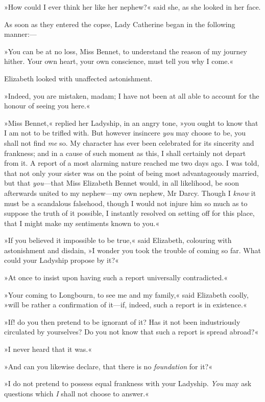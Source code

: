 »How could I ever think her like her nephew?« said she, as she looked in her face.

As soon as they entered the copse, Lady Catherine began in the following manner:—

»You can be at no loss, Miss Bennet, to understand the reason of my journey hither. Your own heart, your own conscience, must tell you why I come.«

Elizabeth looked with unaffected astonishment.

»Indeed, you are mistaken, madam; I have not been at all able to account for the honour of seeing you here.«

»Miss Bennet,« replied her Ladyship, in an angry tone, »you ought to know that I am not to be trifled with. But however insincere \textit{you} may choose to be, you shall not find \textit{me} so. My character has ever been celebrated for its sincerity and frankness; and in a cause of such moment as this, I shall certainly not depart from it. A report of a most alarming nature reached me two days ago. I was told, that not only your sister was on the point of being most advantageously married, but that \textit{you}—that Miss Elizabeth Bennet would, in all likelihood, be soon afterwards united to my nephew—my own nephew, Mr Darcy. Though I \textit{know} it must be a scandalous falsehood, though I would not injure him so much as to suppose the truth of it possible, I instantly resolved on setting off for this place, that I might make my sentiments known to you.«

»If you believed it impossible to be true,« said Elizabeth, colouring with astonishment and disdain, »I wonder you took the trouble of coming so far. What could your Ladyship propose by it?«

»At once to insist upon having such a report universally contradicted.«

»Your coming to Longbourn, to see me and my family,« said Elizabeth coolly, »will be rather a confirmation of it—if, indeed, such a report is in existence.«

»If! do you then pretend to be ignorant of it? Has it not been industriously circulated by yourselves? Do you not know that such a report is spread abroad?«

»I never heard that it was.«

»And can you likewise declare, that there is no \textit{foundation} for it?«

»I do not pretend to possess equal frankness with your Ladyship. \textit{You} may ask questions which \textit{I} shall not choose to answer.«


